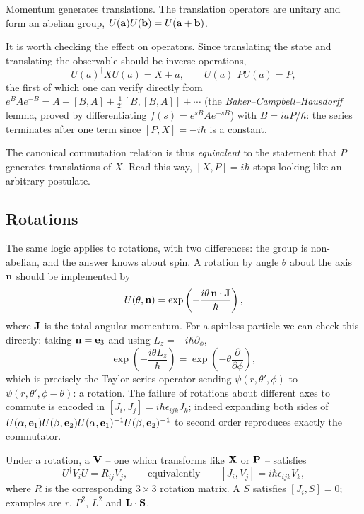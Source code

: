 \documentclass[a4paper]{scrartcl}
\begin{document}
\begin{proposition}
    Momentum generates translations. The translation operators are unitary and form an abelian group, $U(\mathbf{a}) U(\mathbf{b}) = U(\mathbf{a} + \mathbf{b})$.
\end{proposition}

It is worth checking the effect on operators. Since translating the state and translating the observable should be inverse operations,
$$
U(a)^\dagger X U(a) = X + a, \qquad U(a)^\dagger P U(a) = P,
$$
the first of which one can verify directly from $e^{B}Ae^{-B} = A + [B,A] + \frac{1}{2!}[B,[B,A]]+\cdots$ (the \emph{Baker--Campbell--Hausdorff} lemma, proved by differentiating $f(s) = e^{sB}Ae^{-sB}$) with $B = iaP/\hbar$: the series terminates after one term since $[P, X] = -i\hbar$ is a constant.

\begin{remark}
    The canonical commutation relation is thus \emph{equivalent} to the statement that $P$ generates translations of $X$. Read this way, $[X,P] = i\hbar$ stops looking like an arbitrary postulate.
\end{remark}

\subsection{Rotations}

The same logic applies to rotations, with two differences: the group is non-abelian, and the answer knows about spin. A rotation by angle $\theta$ about the axis $\mathbf{n}$ should be implemented by
$$
U(\theta, \mathbf{n}) = \exp\left( -\frac{i \theta \, \mathbf{n}\cdot\mathbf{J}}{\hbar} \right),
$$
where $\mathbf{J}$ is the total angular momentum. For a spinless particle we can check this directly: taking $\mathbf{n} = \mathbf{e}_3$ and using $L_z = -i\hbar\partial_\phi$,
$$
\exp\left( -\frac{i\theta L_z}{\hbar} \right) = \exp\left( -\theta \frac{\partial}{\partial \phi} \right),
$$
which is precisely the Taylor-series operator sending $\psi(r,\theta',\phi)$ to $\psi(r,\theta',\phi - \theta)$: a rotation. The failure of rotations about different axes to commute is encoded in $[J_i,J_j] = i\hbar\epsilon_{ijk}J_k$; indeed expanding both sides of $U(\alpha,\mathbf{e}_1)U(\beta, \mathbf{e}_2)U(\alpha,\mathbf{e}_1)^{-1}U(\beta,\mathbf{e}_2)^{-1}$ to second order reproduces exactly the commutator.

Under a rotation, a  $\mathbf{V}$ -- one which transforms like $\mathbf{X}$ or $\mathbf{P}$ -- satisfies
$$
U^\dagger V_i U = R_{ij}V_j, \qquad \text{equivalently} \qquad [J_i, V_j] = i\hbar\epsilon_{ijk}V_k,
$$
where $R$ is the corresponding $3\times3$ rotation matrix. A  $S$ satisfies $[J_i, S] = 0$; examples are $r$, $P^2$, $L^2$ and $\mathbf{L}\cdot\mathbf{S}$.
\end{document}
